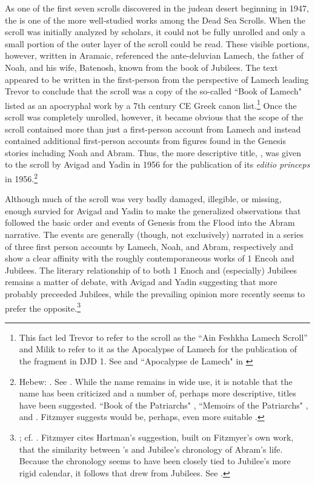 As one of the first seven scrolls discovered in the judean desert beginning in 1947, the \ga is one of the more well-studied works among the Dead Sea Scrolls. When the scroll was initially analyzed by scholars, it could not be fully unrolled and only a small portion of the outer layer of the scroll could be read. These visible portions, however, written in Aramaic, referenced the ante-deluvian Lamech, the father of Noah, and his wife, Batenosh, known from the book of Jubilees. The text appeared to be written in the first-person from the perspective of Lamech leading Trevor to conclude that the scroll was a copy of the so-called ``Book of Lamech" listed as an apocryphal work by a 7th century CE Greek canon list.\footnote{This fact led Trevor to refer to the scroll as the ``Ain Feshkha Lamech Scroll'' and Milik to refer to it as the Apocalypse of Lamech for the publication of the fragment in DJD 1. See \cite[9--10]{trevor_basor1949} and ``Apocalypse de Lamech" in \cite[86--87]{djd_1}} Once the scroll was completely unrolled, however, it became obvious that the scope of the scroll contained more than just a first-person account from Lamech and instead contained additional first-person accounts from figures found in the Genesis stories including Noah and Abram. Thus, the more descriptive title, , was given to the scroll by Avigad and Yadin in 1956 for the publication of its \emph{editio princeps} in 1956.\footnote{Hebew: . See \cite{avigad-yadin1956}. While the name \ga remains in wide use, it is notable that the name has been criticized and a number of, perhaps more descriptive, titles have been suggested. ``Book of the Patriarchs" \autocite[Hebrew: . As suggested by Mazar in][379 n. 2]{flusser_ks1956}, ``Memoirs of the Patriarchs" \autocite[as suggested by][358]{gaster1976}, and  \autocite[as suggested by][14 n. 1.]{milik1959}.  Fitzmyer suggests  would be, perhaps, even more suitable \autocite[16]{fitzmyer2004}.}


Although much of the scroll was very badly damaged, illegible, or missing, enough survied for Avigad and Yadin to make the generalized observations that \ga followed the basic order and events of Genesis from the Flood into the Abram narrative. The events are generally (though, not exclusively) narrated in a series of three first person accounts by Lamech, Noah, and Abram, respectively and show a clear affinity with the roughly contemporaneous works of 1 Encoh and Jubilees.\autocite[16--37]{avigad-yadin1956} The literary relationship of \ga to both 1 Enoch and (especially) Jubilees remains a matter of debate, with Avigad and Yadin suggesting that \ga more probably preceeded Jubilees, while the prevailing opinion more recently seems to prefer the opposite.\footnote{\cite[38]{avigad-yadin1956}; cf. \cite[20--21]{fitzmyer2004}. Fitzmyer cites Hartman's suggestion, built on Fitzmyer's own work, that the similarity between \ga's and Jubilee's chronology of Abram's life. Because the chronology seems to have been closely tied to Jubilee's more rigid calendar, it follows that \ga drew from Jubilees. See \cite[497]{hartman_cbq1966}.}

